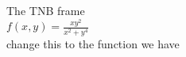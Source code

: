 \documentclass[aspectratio=169]{beamer}
\begin{document}
\begin{frame}[plain]
    \begin{center}
        {\Large The TNB frame}\\[1cm]
        $\displaystyle f(x,y) = \frac{xy^2}{x^2 + y^4}$\\[1cm]
        change this to the function we have
    \end{center}
\end{frame}
\end{document}
